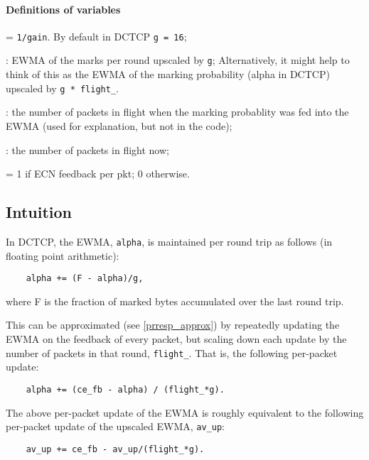 \paragraph{Definitions of variables}
\begin{description}[nosep]
	\item [\texttt{g}] = \texttt{1/gain}. By default in DCTCP \texttt{g = 16};
	\item [\texttt{av\_up}]: EWMA of the marks per round upscaled by \texttt{g}; Alternatively, it might help to think of this as the EWMA of the marking probability (alpha in DCTCP) upscaled by \texttt{g * flight\_}. 
	\item [\texttt{flight\_}]: the number of packets in flight when the marking probablity was fed into the EWMA (used for explanation, but not in the code);
	\item [\texttt{flight}]: the number of packets in flight now;
	\item [\texttt{ce\_fb}] = 1 if ECN feedback per pkt; 0 otherwise.
\end{description}

\subsection{Intuition}\label{prresp_intuition}

In DCTCP, the EWMA, \texttt{alpha}, is maintained per round trip as follows (in floating point arithmetic):
\begin{verbatim}
    alpha += (F - alpha)/g,
\end{verbatim}
where F is the fraction of marked bytes accumulated over the last round trip.

This can be approximated (see \autoref{prresp_approx}) by repeatedly updating the EWMA on the feedback of every packet, but scaling down each update by the number of packets in that round, \texttt{flight\_}. That is, the following per-packet update:
\begin{verbatim}
    alpha += (ce_fb - alpha) / (flight_*g).
\end{verbatim}

The above per-packet update of the EWMA is roughly equivalent to the following per-packet update of the upscaled EWMA, \texttt{av\_up}:
\begin{verbatim}
    av_up += ce_fb - av_up/(flight_*g).
\end{verbatim}

